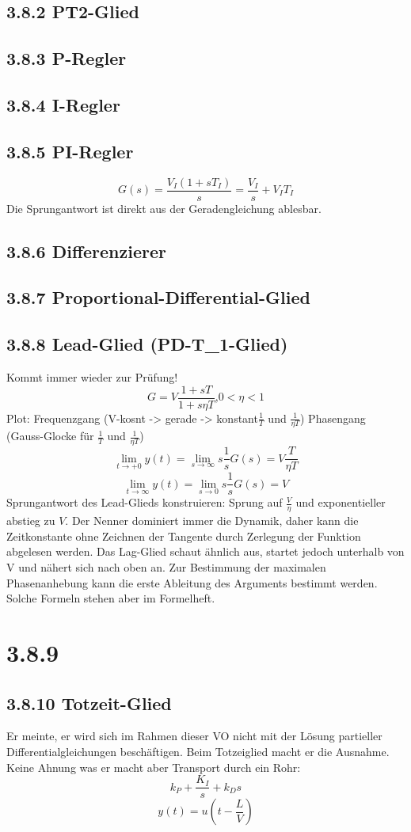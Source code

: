 \documentclass[a4paper]{article}
\begin{document}
\subsection*{3.8.2 PT2-Glied}
\subsection*{3.8.3 P-Regler}
\subsection*{3.8.4 I-Regler}
\subsection*{3.8.5 PI-Regler}
\[ G(s)=\frac{V_{I}(1+sT_{I})}{s}=\frac{V_{I}}{s}+V_{I}T_{I} \]
Die Sprungantwort ist direkt aus der Geradengleichung ablesbar.
\subsection*{3.8.6 Differenzierer}
\subsection*{3.8.7 Proportional-Differential-Glied}
\subsection*{3.8.8 Lead-Glied (PD-T_{1}-Glied)}
Kommt immer wieder zur Prüfung!
\[ G=V \frac{1+sT}{1+s\eta T}\text{,} 0 < \eta < 1\]
Plot: Frequenzgang (V-kosnt -> gerade -> konstant$\frac{1}{T}$ und $\frac{1}{\eta T}$) Phasengang (Gauss-Glocke für $\frac{1}{T}$ und $\frac{1}{\eta T}$)
\[ \lim_{t \to +0} y(t)=\lim_{s \to \infty} s \frac{1}{s}G(s)=V \frac{T}{\eta T} \]
\[ \lim_{t \to \infty} y(t)=\lim_{s \to 0} s \frac{1}{s}G(s)=V \]
Sprungantwort des Lead-Glieds konstruieren: Sprung auf $\frac{V}{\eta}$ und exponentieller abstieg zu $V$.
Der Nenner dominiert immer die Dynamik, daher kann die Zeitkonstante ohne Zeichnen der Tangente durch Zerlegung der Funktion abgelesen werden.
Das Lag-Glied schaut ähnlich aus, startet jedoch unterhalb von V und nähert sich nach oben an.
Zur Bestimmung der maximalen Phasenanhebung kann die erste Ableitung des Arguments bestimmt werden. Solche Formeln stehen aber im Formelheft.

\section*{3.8.9}
\subsection*{3.8.10 Totzeit-Glied}
Er meinte, er wird sich im Rahmen dieser VO nicht mit der Lösung partieller Differentialgleichungen beschäftigen. Beim Totzeiglied macht er die Ausnahme.
Keine Ahnung was er macht aber Transport durch ein Rohr:
\[ k_{P}+\frac{K_{I}}{s}+k_{D}s \]
\[ y(t)=u(t-\frac{L}{V}) \]
\end{document}
